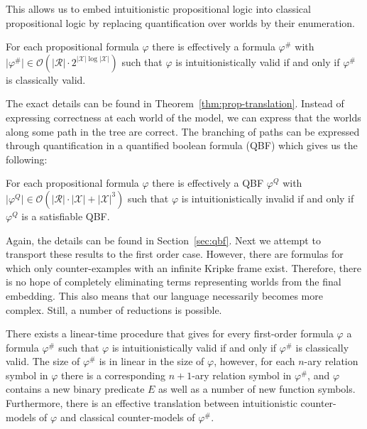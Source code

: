 \documentclass[runningheads]{llncs}
\begin{document}
This allows us to embed intuitionistic propositional logic into classical propositional logic by replacing quantification over worlds by their enumeration.

\begin{lemma}
	For each propositional formula $\varphi$ there is effectively a formula $\varphi^\#$ with $\mathcal |\varphi^\#|\in\mathcal O(|\mathcal R|\cdot 2^{|\mathcal X|\log|\mathcal X|})$ such that $\varphi$ is intuitionistically valid if and only if $\varphi^\#$ is classically valid.
\end{lemma}

The exact details can be found in Theorem~\ref{thm:prop-translation}. Instead of expressing correctness at each world of the model, we can express that the worlds along some path in the tree are correct. The branching of paths can be expressed through quantification in a quantified boolean formula (QBF) which gives us the following:

\begin{lemma}
	For each propositional formula $\varphi$ there is effectively a QBF $\varphi^Q$ with $\mathcal |\varphi^Q|\in\mathcal O(|\mathcal R|\cdot|\mathcal X| + |\mathcal X|^3)$ such that $\varphi$ is intuitionistically invalid if and only if $\varphi^Q$ is a satisfiable QBF.
\end{lemma}

Again, the details can be found in Section~\ref{sec:qbf}. Next we attempt to transport these results to the first order case. However, there are formulas for which only counter-examples with an infinite Kripke frame exist. Therefore, there is no hope of completely eliminating terms representing worlds from the final embedding. This also means that our language necessarily becomes more complex. Still, a number of reductions is possible.

\begin{theorem}
	\label{thm:reduction-first-order-short}
	There exists a linear-time procedure that gives for every first-order formula $\varphi$ a formula $\varphi^\#$ such that $\varphi$ is intuitionistically valid if and only if $\varphi^\#$ is classically valid. The size of $\varphi^\#$ is in linear in the size of $\varphi$, however, for each $n$-ary relation symbol in $\varphi$ there is a corresponding $n+1$-ary relation symbol in $\varphi^\#$, and $\varphi$ contains a new binary predicate $E$ as well as a number of new function symbols. Furthermore, there is an effective translation between intuitionistic counter-models of $\varphi$ and classical counter-models of $\varphi^\#$.
\end{theorem}
\end{document}
